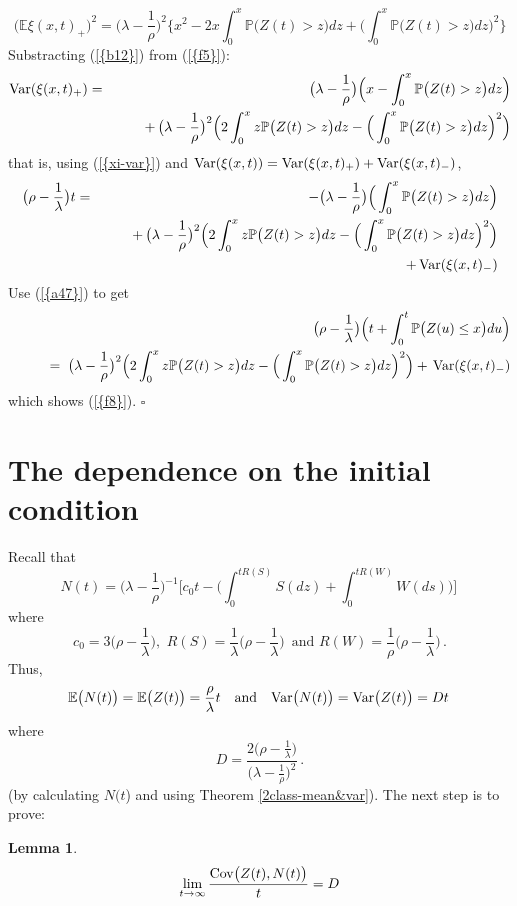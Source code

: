 \documentclass[reqno, 12pt]{amsart}
\newtheorem{lemma}{Lemma}
\begin{document}
\begin{equation}
  \label{b12}
  \big({{\mathbb E}}\xi(x,t)_+\big)^2 =\big(\lambda-\frac{1}{\rho}\big)^2
  \Big\{x^2-2x\int_0^x{{\mathbb P}}\big(Z(t)> z\big)dz
  +\Big(\int_0^x{{\mathbb P}}\big(Z(t)>z\big)dz\Big)^2\Big\}
\end{equation}
Substracting {(\ref{{b12}})} from {(\ref{{f5}})}:
\begin{eqnarray}
  \label{f6}
  {{\rm Var}}(\xi(x,t)_+)
  &=&  \big(\lambda-\frac{1}{\rho}\big)\Big(x-\int_0^x{{\mathbb P}}\big(Z(t)>z\big)dz\Big)
  \nonumber\\
  && \qquad +\, \big(\lambda-\frac{1}{\rho}\big)^2\Big(2\int_0^x z
  {{\mathbb P}}\big(Z(t)> z\big)dz-\Big(\int_0^x{{\mathbb P}}\big(Z(t)>z\big)dz\Big)^2\Big)\nonumber
\end{eqnarray}
that is, using {(\ref{{xi-var}})} and  ${{\rm Var}}(\xi(x,t))= {{\rm Var}}(\xi(x,t)_+) +{{\rm Var}}(\xi(x,t)_-)$,
\begin{eqnarray}
  \label{f7}
  \big(\rho-\frac{1}{\lambda}\big)t
  &=&  -\big(\lambda-\frac{1}{\rho}\big)\Big(\int_0^x{{\mathbb P}}\big(Z(t)>z\big)dz\Big)
  \nonumber\\
  && \qquad +\, \big(\lambda-\frac{1}{\rho}\big)^2\Big(2\int_0^x z
  {{\mathbb P}}\big(Z(t)> z\big)dz-\Big(\int_0^x{{\mathbb P}}\big(Z(t)>z\big)dz\Big)^2\Big)\nonumber\\
&& \qquad +\, {{\rm Var}}(\xi(x,t)_-)\nonumber
\end{eqnarray}
Use {(\ref{{a47}})} to get
\begin{eqnarray}
  \label{f7}
  &&\big(\rho-\frac{1}{\lambda}\big)\Big(t+\int_0^t{{\mathbb P}}\big(Z(u)\le x\big)du\Big)
  \nonumber\\
  && \qquad =\; \big(\lambda-\frac{1}{\rho}\big)^2\Big(2\int_0^x z
  {{\mathbb P}}\big(Z(t)> z\big)dz-\Big(\int_0^x{{\mathbb P}}\big(Z(t)>z\big)dz\Big)^2\Big)+\, {{\rm Var}}(\xi(x,t)_-)\nonumber
\end{eqnarray}
which shows {(\ref{{f8}})}. {$\square$ \vskip 2mm}

\section{The dependence on the initial condition}
Recall that
$$
N(t)=\big(\lambda-\frac{1}{\rho}\big)^{-1}\Big[c_0 t-\Big(\int_0^{tR(S) }S(dz) +\int_0^{tR(W)}W(ds)\Big)\Big]\,
$$
where
$$
c_0=3\Big(\rho-\frac{1}{\lambda}\Big),\, \,R(S)=\frac{1}{\lambda}\Big(\rho-\frac{1}{\lambda}\Big)\,\mbox{ and }R(W)=\frac{1}{\rho}\Big(\rho-\frac{1}{\lambda}\Big)\,.
$$
Thus,
\begin{equation}\label{dep-1}
{{\mathbb E}} \big(N(t)\big) = {{\mathbb E}}\big(Z(t)\big) = \frac{\rho}{\lambda}t\,\,\,\,\mbox{ and }\,\,\,\,{{\rm Var}} \big(N(t)\big)={{\rm Var}} \big(Z(t)\big)=Dt\,
\end{equation}
where
$$
D=\frac{2\big(\rho-\frac{1}{\lambda}\big)}{\big(\lambda-\frac{1}{\rho}\big)^{2}}\,.
$$
(by calculating $N(t$) and using Theorem \ref{2class-mean&var}). The next step is to prove:
\begin{lemma}\label{cov}
$$
\lim_{t\to\infty}\frac{{{\rm Cov}} \big(Z(t),N(t)\big)}{t}=D$$
\end{lemma}
\end{document}
